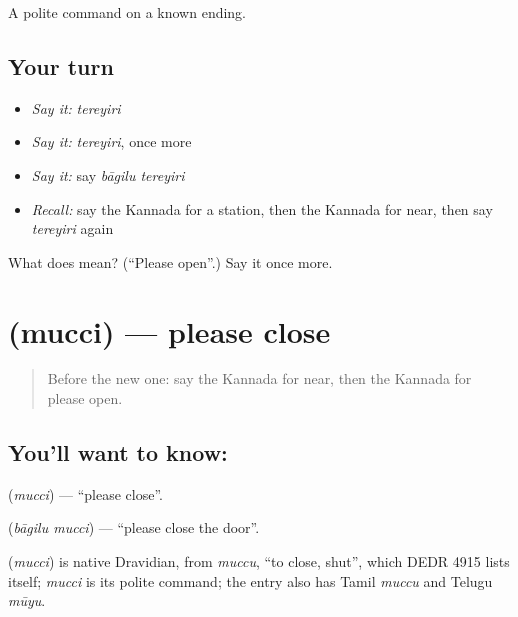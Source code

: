 \begin{grammarlens}[title={What you've built}]
A polite command on a known ending.
\end{grammarlens}

\subsection*{Your turn}
\begin{itemize}
\raggedright
  \item \emph{Say it:} \emph{tereyiri}
  \item \emph{Say it:} \emph{tereyiri}, once more
  \item \emph{Say it:} say \emph{bāgilu tereyiri}
  \item \emph{Recall:} say the Kannada for a station, then the Kannada for near, then say \emph{tereyiri} again
\end{itemize}

\begin{tcolorbox}[breakable,colback=teal!4,colframe=teal!35!black,title={Before you move on}]
What does  mean? (\textquotedblleft{}Please open\textquotedblright{}.) Say it once more.
\end{tcolorbox}
\section[\texorpdfstring{\kn{ಮುಚ್ಚಿ} (mucci)}{ಮುಚ್ಚಿ (mucci)}]{ (mucci) — please close}

\label{lesson:KA-C101-close}



\begin{quote}
Before the new one: say the Kannada for near, then the Kannada for please open.
\end{quote}

\subsection*{You'll want to know: }
\textbf{} (\emph{mucci}) — \textquotedblleft{}please close\textquotedblright{}.

\textbf{ } (\emph{bāgilu mucci}) — \textquotedblleft{}please close the door\textquotedblright{}.

\begin{cousinweb}
\textbf{} (\emph{mucci}) is native Dravidian, from \emph{muccu}, \textquotedblleft{}to close, shut\textquotedblright{}, which DEDR 4915 lists itself; \emph{mucci} is its polite command; the entry also has Tamil \emph{muccu} and Telugu \emph{mūyu}.
\end{cousinweb}

